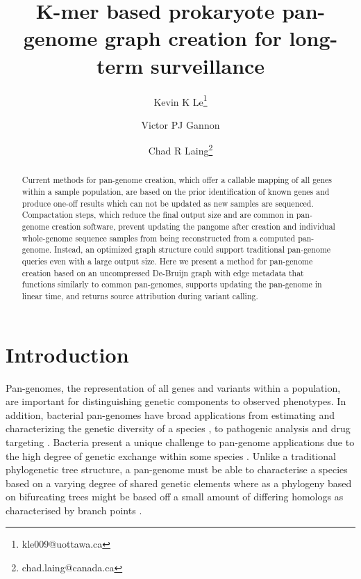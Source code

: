 \documentclass{article}
\begin{document}
\title{K-mer based prokaryote pan-genome graph creation for long-term surveillance}

\author[1]{Kevin K Le\thanks{kle009@uottawa.ca}}
\author[1]{Victor PJ Gannon}
\author[2]{Chad R Laing\thanks{chad.laing@canada.ca}}

\renewcommand\Authands{ and }

\maketitle

\begin{abstract}

Current methods for pan-genome creation, which offer a callable mapping of all genes within a sample population, are based on the prior identification of known genes and produce one-off results which can not be updated as new samples are sequenced.
Compactation steps, which reduce the final output size and are common in pan-genome creation software, prevent updating the pangome after creation and individual whole-genome sequence samples from being reconstructed from a computed pan-genome.
Instead, an optimized graph structure could support traditional pan-genome queries even with a large output size.
Here we present a method for pan-genome creation based on an uncompressed De-Bruijn graph with edge metadata that functions similarly to common pan-genomes, supports updating the pan-genome in linear time, and returns source attribution during variant calling.


\end{abstract}


\section{Introduction}

Pan-genomes, the representation of all genes and variants within a population, are important for distinguishing genetic components to observed phenotypes.
In addition, bacterial pan-genomes have broad applications from estimating and characterizing the genetic diversity of a species \cite{medini2005microbial}, to pathogenic analysis \cite{tettelin2005genome, rasko2008pangenome} and drug targeting \cite{muzzi2007pan}.
Bacteria present a unique challenge to pan-genome applications due to the high degree of genetic exchange within some species \cite{medini2005microbial}.
Unlike a traditional phylogenetic tree structure, a pan-genome must be able to characterise a species based on a varying degree of shared genetic elements where as a phylogeny based on bifurcating trees might be based off a small amount of differing homologs as characterised by branch points \cite{vernikos2015ten}.
\end{document}
